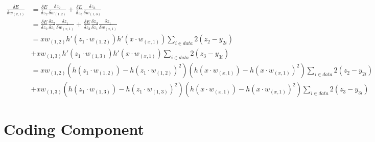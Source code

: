\documentclass[12pt]{article}
\newenvironment{solution}[2][Solution]{\begin{trivlist}
\item[\hskip \labelsep {\bfseries #1}]}{\end{trivlist}}
\begin{document}
\begin{solution}{}
\begin{align*}
\frac{\delta E}{\delta w_{(x,1)}} &= \frac{\delta E}{\delta z_2}\frac{\delta z_2}{\delta w_{(1,2)}}+\frac{\delta E}{\delta z_3}\frac{\delta z_3}{\delta w_{(1,3)}}\\
&= \frac{\delta E}{\delta z_2}\frac{\delta z_2}{\delta z_1}\frac{\delta z_1}{\delta w_{(x,1)}}+\frac{\delta E}{\delta z_3}\frac{\delta z_3}{\delta z_1}\frac{\delta z_1}{\delta w_{(x,1)}}\\
&= xw_{(1,2)}h'(z_1\cdot w_{(1,2)})h'(x\cdot w_{(x,1)})\sum_{i\in data}2(z_2-y_{2i})\\
&+ xw_{(1,3)}h'(z_1\cdot w_{(1,3)})h'(x\cdot w_{(x,1)})\sum_{i\in data}2(z_3-y_{3i})\\
&= xw_{(1,2)}(h(z_1\cdot w_{(1,2)})-h(z_1\cdot w_{(1,2)})^2)(h(x\cdot w_{(x,1)})-h(x\cdot w_{(x,1)})^2)\sum_{i\in data}2(z_2-y_{2i})\\
&+ xw_{(1,3)}(h(z_1\cdot w_{(1,3)})-h(z_1\cdot w_{(1,3)})^2)(h(x\cdot w_{(x,1)})-h(x\cdot w_{(x,1)})^2)\sum_{i\in data}2(z_3-y_{3i})
\end{align*}
\end{solution}

\section{Coding Component}


\end{document}
